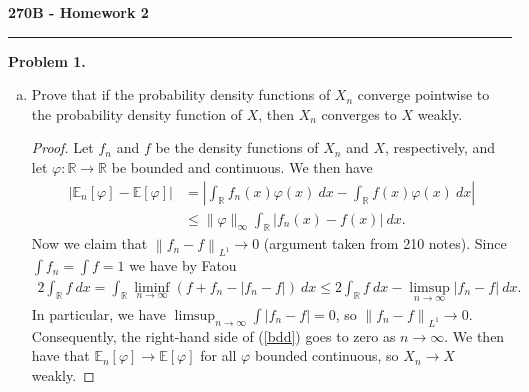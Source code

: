 \documentclass[11pt,letterpaper]{report}
\newcommand{\reals}{\mathbb{R}}
\newcommand{\Lp}[2]{\left\|{#1}\right\|_{L^{#2}}}
\newcommand{\E}{\mathbb{E}}
\begin{document}
\begin{center}
{\bf \Large 270B - Homework 2}
\vspace{0.2cm}
\hrule
\end{center}

\noindent\textbf{Problem 1. }
\begin{enumerate}[(a)]
	\item Prove that if the probability density functions of $X_n$ converge pointwise to the probability density function of $X$, then $X_n$ converges to $X$ weakly.

	\begin{proof}
		Let $f_n$ and $f$ be the density functions of $X_n$ and $X$, respectively, and let $\varphi:\reals\to \reals$ be bounded and continuous. We then have
		\begin{equation}\label{bdd}
		\begin{split}
			|\E_n[\varphi] - \E[\varphi]| &= \left|\int_\reals f_n(x)\varphi(x)\ dx - \int_\reals f(x)\varphi(x)\ dx\right|\\
			&\leq \|\varphi\|_\infty \int_\reals|f_n(x) - f(x)|\ dx.
		\end{split}
		\end{equation}
		Now we claim that $\Lp{f_n - f}{1}\to 0$ (argument taken from 210 notes). Since $\int f_n = \int f = 1$ we have by Fatou
		\begin{align*}
		2\int_\reals f\ dx = \int_\reals\liminf_{n\to \infty}(f + f_n - |f_n - f|)\ dx \leq 2\int_\reals f\ dx - \limsup_{n\to \infty}|f_n - f|\ dx.
		\end{align*}
		In particular, we have $\limsup_{n\to \infty}\int |f_n - f| = 0$, so $\Lp{f_n - f}{1}\to 0$. Consequently, the right-hand side of (\ref{bdd}) goes to zero as $n\to \infty$. We then have that $\E_n[\varphi]\to \E[\varphi]$ for all $\varphi$ bounded continuous, so $X_n\to X$ weakly.
	\end{proof}


\end{enumerate}
\end{document}

